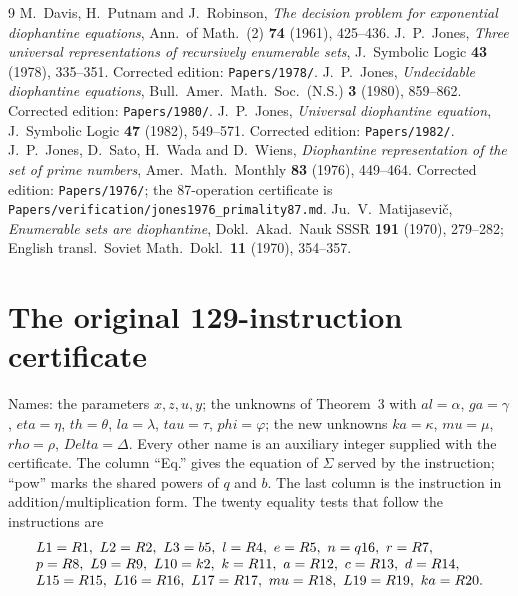 \documentclass[11pt,letterpaper]{article}
\theoremstyle{definition}
\theoremstyle{remark}
\numberwithin{equation}{section}
\newcommand{\Matijasevic}{Matijasevi\v{c}}
\newcommand{\file}[1]{\texttt{#1}}
\begin{document}
\begin{thebibliography}{9}\small
{} M.~Davis, H.~Putnam and J.~Robinson, \textit{The decision
problem for exponential diophantine equations}, Ann.\ of Math.\ (2)
\textbf{74} (1961), 425--436.
 J.~P.~Jones, \textit{Three universal representations of
recursively enumerable sets}, J.\ Symbolic Logic \textbf{43} (1978),
335--351. Corrected edition: \file{Papers/1978/}.
 J.~P.~Jones, \textit{Undecidable diophantine equations},
Bull.\ Amer.\ Math.\ Soc.\ (N.S.) \textbf{3} (1980), 859--862. Corrected
edition: \file{Papers/1980/}.
 J.~P.~Jones, \textit{Universal diophantine equation},
J.\ Symbolic Logic \textbf{47} (1982), 549--571. Corrected edition:
\file{Papers/1982/}.
 J.~P.~Jones, D.~Sato, H.~Wada and D.~Wiens,
\textit{Diophantine representation of the set of prime numbers}, Amer.\
Math.\ Monthly \textbf{83} (1976), 449--464. Corrected edition:
\file{Papers/1976/}; the 87-operation certificate is
\file{Papers/verification/jones1976\_primality87.md}.
 Ju.~V.~\Matijasevic, \textit{Enumerable sets are
diophantine}, Dokl.\ Akad.\ Nauk SSSR \textbf{191} (1970), 279--282;
English transl.\ Soviet Math.\ Dokl.\ \textbf{11} (1970), 354--357.
\end{thebibliography}

\appendix
\renewcommand{\thesection}{\AlphAlph{\value{section}}}
\section{The original 129-instruction certificate}\label{app:129}

Names: the parameters $x,z,u,y$; the unknowns of Theorem~3 with
$al=\alpha$, $ga=\gamma$, $eta=\eta$, $th=\theta$, $la=\lambda$,
$tau=\tau$, $phi=\varphi$; the new unknowns $ka=\kappa$, $mu=\mu$,
$rho=\rho$, $Delta=\Delta$. Every other name is an auxiliary integer supplied
with the certificate. The column ``Eq.'' gives the equation of $\Sigma$
served by the instruction; ``pow'' marks the shared powers of $q$ and $b$.
The last column is the instruction in addition/multiplication form. The
twenty equality tests that follow the instructions are
\[
\begin{array}{@{}l@{}}
 L1=R1,\ L2=R2,\ L3=b5,\ l=R4,\ e=R5,\ n=q16,\ r=R7,\\
 p=R8,\ L9=R9,\ L10=k2,\ k=R11,\ a=R12,\ c=R13,\ d=R14,\\
 L15=R15,\ L16=R16,\ L17=R17,\ mu=R18,\ L19=R19,\ ka=R20.
\end{array}
\]
\end{document}
